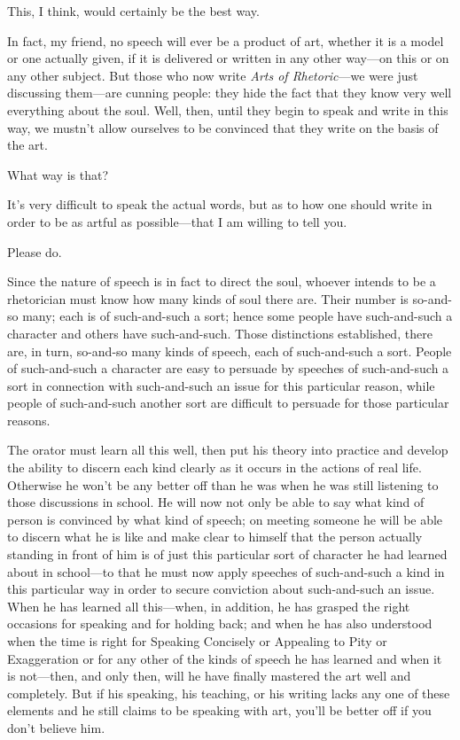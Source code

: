 \sayphaedrus This, I think, would certainly be the best way.

\saysocrates In fact, my friend, no speech will ever be a product of art,
whether it is a model or one actually given, if it is delivered or
written in any other way---on this or on any other subject. But
those who now write {\em Arts of Rhetoric}---we were just discussing
them---are cunning people: they hide the fact that they know very well
everything about the soul. Well, then, until they begin to speak and
write in this way, we mustn’t allow ourselves to be convinced that they
write on the basis of the art.

\sayphaedrus What way is that?

\saysocrates It’s very difficult to speak the actual words, but as to how
one should write in order to be as artful as possible---that I am
willing to tell you.

\sayphaedrus Please do.

\saysocrates Since the nature of speech is in fact to direct the
soul, whoever intends to be a rhetorician must know how many kinds of
soul there are. Their number is so-and-so many; each is of such-and-such
a sort; hence some people have such-and-such a character and others have
such-and-such. Those distinctions established, there are, in turn,
so-and-so many kinds of speech, each of such-and-such a sort. People of
such-and-such a character are easy to persuade by speeches of
such-and-such a sort in connection with such-and-such an issue for this
particular reason, while people of such-and-such another sort are
difficult to persuade for those particular reasons.

The orator must learn all this well, then put his theory into practice
and develop the ability to discern each kind clearly as it
occurs in the actions of real life. Otherwise he won’t be any better off
than he was when he was still listening to those discussions in school.
He will now not only be able to say what kind of person is convinced by
what kind of speech; on meeting someone he will be able
to discern what he is like and make clear to himself that the person
actually standing in front of him is of just this particular sort of
character he had learned about in school---to that he must now apply
speeches of such-and-such a kind in this particular way in order to
secure conviction about such-and-such an issue. When he has learned all
this---when, in addition, he has grasped the right occasions for
speaking and for holding back; and when he has also understood when the
time is right for Speaking Concisely or Appealing to Pity or
Exaggeration or for any other of the kinds of speech he has learned and
when it is not---then, and only then, will he have finally mastered the
art well and completely. But if his speaking, his teaching, or his
writing lacks any one of these elements and he still claims to
be speaking with art, you’ll be better off if you don’t believe him.

